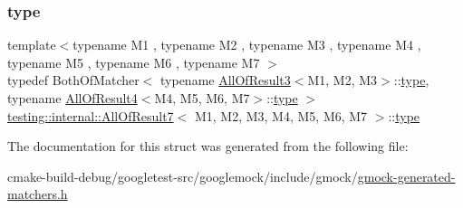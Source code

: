 \subsubsection{\texorpdfstring{type}{type}}
{\footnotesize\ttfamily template$<$typename M1 , typename M2 , typename M3 , typename M4 , typename M5 , typename M6 , typename M7 $>$ \\
typedef Both\+Of\+Matcher$<$ typename \mbox{\hyperlink{structtesting_1_1internal_1_1AllOfResult3}{All\+Of\+Result3}}$<$M1, M2, M3$>$\+::\mbox{\hyperlink{structtesting_1_1internal_1_1AllOfResult7_a47ab0d670258434b0e65530591948e8c}{type}}, typename \mbox{\hyperlink{structtesting_1_1internal_1_1AllOfResult4}{All\+Of\+Result4}}$<$M4, M5, M6, M7$>$\+::\mbox{\hyperlink{structtesting_1_1internal_1_1AllOfResult7_a47ab0d670258434b0e65530591948e8c}{type}} $>$ \mbox{\hyperlink{structtesting_1_1internal_1_1AllOfResult7}{testing\+::internal\+::\+All\+Of\+Result7}}$<$ M1, M2, M3, M4, M5, M6, M7 $>$\+::\mbox{\hyperlink{structtesting_1_1internal_1_1AllOfResult7_a47ab0d670258434b0e65530591948e8c}{type}}}



The documentation for this struct was generated from the following file\+:\begin{DoxyCompactItemize}
\item 
cmake-\/build-\/debug/googletest-\/src/googlemock/include/gmock/\mbox{\hyperlink{gmock-generated-matchers_8h}{gmock-\/generated-\/matchers.\+h}}\end{DoxyCompactItemize}
